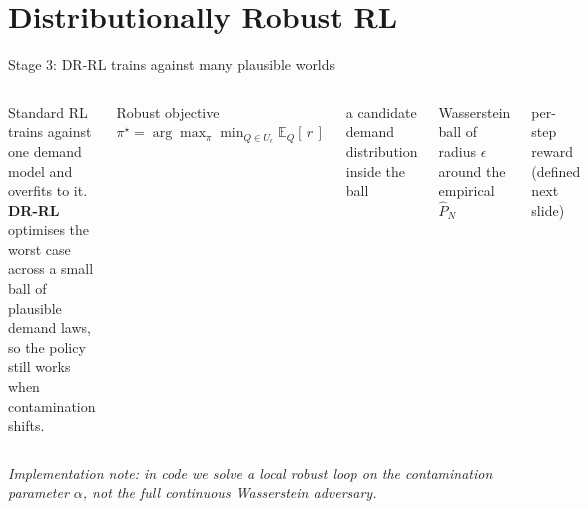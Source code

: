 \documentclass[aspectratio=169,11pt]{beamer}
\newcommand{\vardef}[2]{%
  \par\noindent\makebox[1.55cm][l]{\textbf{\color{PhantomCyan}#1}}%
  \parbox[t]{\dimexpr\linewidth-1.65cm}{\small #2}\par\smallskip%
}
\begin{document}
\section{Distributionally Robust RL}

\begin{frame}{Stage 3: DR-RL trains against \alert{many plausible worlds}}
  \begin{columns}[T,onlytextwidth]
    \footnotesize
    Standard RL trains against one demand model and overfits to it.
    \textbf{DR-RL} optimises the worst case across a small ball of
    plausible demand laws, so the policy still works when contamination
    shifts.

    \vspace{0.6em}
    \begin{block}{Robust objective}
      \(\displaystyle \pi^\star = \arg\max_\pi \min_{Q \in U_\epsilon} \mathbb{E}_Q[\,r\,]\)
    \end{block}
    \vardef{$Q$}{a candidate demand distribution inside the ball}
    \vardef{$U_\epsilon$}{Wasserstein ball of radius $\epsilon$ around the empirical $\hat P_N$}
    \vardef{$r$}{per-step reward (defined next slide)}

    \centering
  \end{columns}

  \vspace{0.3em}
  {\footnotesize\textit{Implementation note: in code we solve a local robust loop on the contamination parameter $\alpha$, not the full continuous Wasserstein adversary.}}
\end{frame}
\end{document}
